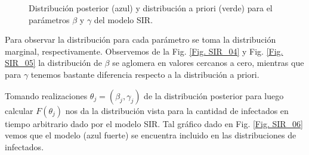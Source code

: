 \begin{figure}[h]
    \centering
    \qquad
    \caption{Distribución posterior (azul) y distribución a priori (verde) para el parámetros $\beta$ y $\gamma$ del modelo SIR. }
    \label{Fig. SIR.theta}
\end{figure}

Para observar la distribución para cada parámetro se toma la distribución marginal, respectivamente. Observemos de la Fig. \ref{Fig. SIR_04} y Fig. \ref{Fig. SIR_05} la distribución de $\beta$ se aglomera en valores cercanos a cero, mientras que para $\gamma$ tenemos bastante diferencia respecto a la distribución a priori.

Tomando realizaciones $ \theta_j = (\beta_j,\gamma_j)$ de la distribución posterior para luego calcular $F(\theta_j)$ nos da la distribución vista para la cantidad de infectados en tiempo arbitrario dado por el modelo SIR. Tal gráfico dado en Fig. \ref{Fig. SIR_06} vemos que el modelo (azul fuerte) se encuentra incluido en las distribuciones de infectados.

